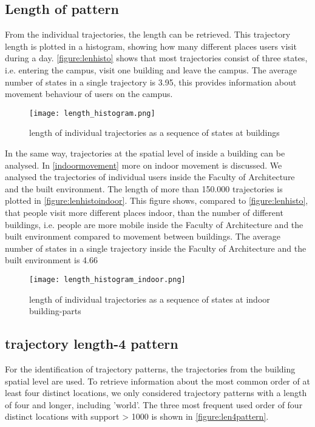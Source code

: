 \subsection{Length of pattern}
From the individual trajectories, the length can be retrieved. This trajectory length is plotted in a histogram, showing how many different places users visit during a day. \autoref{figure:lenhisto} shows that most trajectories consist of three states, i.e. entering the campus, visit one building and leave the campus. The average number of states in a single trajectory is 3.95, this provides information about movement behaviour of users on the campus. 

\begin{figure}[H]
\centering
\texttt{[image: length\_histogram.png]}
\captionsetup{justification=centering}
\caption{length of individual trajectories as a sequence of states at buildings}
\label{figure:lenhisto}
\end{figure}
In the same way, trajectories at the spatial level of inside a building can be analysed. In \autoref{indoormovement} more on indoor movement is discussed. We analysed the trajectories of individual users inside the Faculty of Architecture and the built environment. The length of more than 150.000 trajectories is plotted in \autoref{figure:lenhistoindoor}. This figure shows, compared to \autoref{figure:lenhisto}, that people visit more different places indoor, than the number of different buildings, i.e. people are more mobile inside the Faculty of Architecture and the built environment compared to movement between buildings. The average number of states in a single trajectory inside the Faculty of Architecture and the built environment is 4.66

\begin{figure}[H]
\centering
\texttt{[image: length\_histogram\_indoor.png]}
\captionsetup{justification=centering}
\caption{length of individual trajectories as a sequence of states at indoor building-parts}
\label{figure:lenhistoindoor}
\end{figure}

\subsection{trajectory length-4 pattern}
For the identification of trajectory patterns, the trajectories from the building spatial level are used. To retrieve information about the most common order of at least four distinct locations, we only considered trajectory patterns with a length of four and longer, including 'world'. The three most frequent used order of four distinct locations with support > 1000 is shown in \autoref{figure:len4pattern}.

